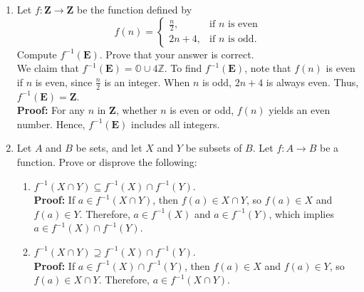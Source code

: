 \documentclass{article}
\begin{document}
\begin{enumerate}
\begin{enumerate}
    \end{enumerate}

    \item Let \( f \colon \mathbf{Z} \to \mathbf{Z} \) be the function defined by
    \[
    f(n) =
    \begin{cases}
    \frac{n}{2}, & \text{if } n \text{ is even} \\
    2n+4, & \text{if } n \text{ is odd}.
    \end{cases}
    \]
    Compute \( f^{-1}(\mathbf{E}) \). Prove that your answer is correct. \\


    We claim that \( f^{-1}(\mathbf{E})  = \mathbb{O} \cup 4\mathbb{Z}\).
    To find \( f^{-1}(\mathbf{E}) \), note that \( f(n) \) is even if \( n \) is even, since \( \frac{n}{2} \) is an integer. When \( n \) is odd, \( 2n+4 \) is always even. Thus, \( f^{-1}(\mathbf{E}) = \mathbf{Z} \). \\
    \textbf{Proof:} For any \( n \) in \( \mathbf{Z} \), whether \( n \) is even or odd, \( f(n) \) yields an even number. Hence, \( f^{-1}(\mathbf{E}) \) includes all integers.

    \item Let \( A \) and \( B \) be sets, and let \( X \) and \( Y \) be subsets of \( B \). Let \( f \colon A \to B \) be a function. Prove or disprove the following:
    \begin{enumerate}
        \item \( f^{-1}(X \cap Y) \subseteq f^{-1}(X) \cap f^{-1}(Y) \). \\
        \textbf{Proof:} If \( a \in f^{-1}(X \cap Y) \), then \( f(a) \in X \cap Y \), so \( f(a) \in X \) and \( f(a) \in Y \). Therefore, \( a \in f^{-1}(X) \) and \( a \in f^{-1}(Y) \), which implies \( a \in f^{-1}(X) \cap f^{-1}(Y) \).
        
        \item \( f^{-1}(X \cap Y) \supseteq f^{-1}(X) \cap f^{-1}(Y) \). \\
        \textbf{Proof:} If \( a \in f^{-1}(X) \cap f^{-1}(Y) \), then \( f(a) \in X \) and \( f(a) \in Y \), so \( f(a) \in X \cap Y \). Therefore, \( a \in f^{-1}(X \cap Y) \).
    \end{enumerate}
\end{enumerate}
\end{document}
